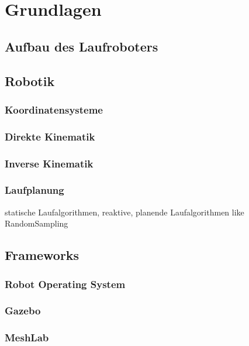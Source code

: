 \chapter{Grundlagen}

\section{Aufbau des Laufroboters}

\section{Robotik}

\subsection{Koordinatensysteme}
\subsection{Direkte Kinematik}
\subsection{Inverse Kinematik}
\subsection{Laufplanung}

statische Laufalgorithmen, reaktive, planende Laufalgorithmen like RandomSampling

\section{Frameworks}

\subsection{Robot Operating System}
\subsection{Gazebo}
\subsection{MeshLab}